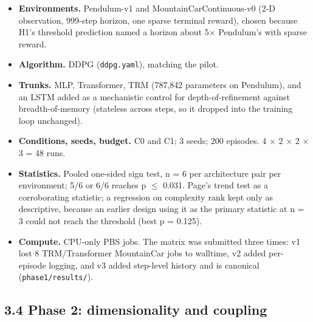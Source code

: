 \documentclass[11pt]{article}
\begin{document}
\begin{itemize}
\item \textbf{Environments.} Pendulum-v1 and MountainCarContinuous-v0 (2-D observation, 999-step horizon, one sparse terminal reward), chosen because H1's threshold prediction named a horizon about 5$\times$ Pendulum's with sparse reward.
\item \textbf{Algorithm.} DDPG (\texttt{ddpg.yaml}), matching the pilot.
\item \textbf{Trunks.} MLP, Transformer, TRM (787,842 parameters on Pendulum), and an LSTM added as a mechanistic control for depth-of-refinement against breadth-of-memory (stateless across steps, so it dropped into the training loop unchanged).
\item \textbf{Conditions, seeds, budget.} C0 and C1; 3 seeds; 200 episodes. 4 $\times$ 2 $\times$ 2 $\times$ 3 = 48 runs.
\item \textbf{Statistics.} Pooled one-sided sign test, n = 6 per architecture pair per environment; 5/6 or 6/6 reaches p $\leq$ 0.031. Page's trend test as a corroborating statistic; a regression on complexity rank kept only as descriptive, because an earlier design using it as the primary statistic at n = 3 could not reach the threshold (best p = 0.125).
\item \textbf{Compute.} CPU-only PBS jobs. The matrix was submitted three times: v1 lost 8 TRM/Transformer MountainCar jobs to walltime, v2 added per-episode logging, and v3 added step-level history and is canonical (\texttt{phase1/\allowbreak{}results/\allowbreak{}}).
\end{itemize}



\subsection*{3.4 Phase 2: dimensionality and coupling}
\end{document}

